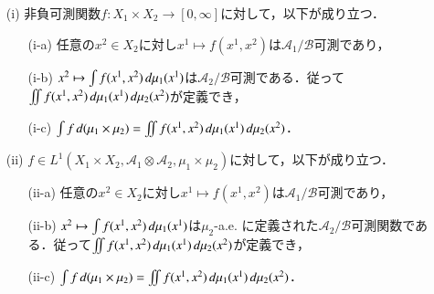 \begin{thm}[Fubini]
\leavevmode
\begin{enumerate}
\item[(i)] 非負可測関数$f \colon X_1 \times X_2 \to [0,\infty]$に対して，以下が成り立つ．
\begin{enumerate}
\item[(i-a)] 任意の$x^2 \in X_2$に対し$x^1 \mapsto f(x^1,x^2)$は$\mathcal{A}_1/\mathcal{B}$可測であり，
\item[(i-b)] $x^2 \mapsto \int f(x^1, x^2) \mathop{}\!d\mu_1(x^1)$は$\mathcal{A}_2/\mathcal{B}$可測である．従って$\iint f(x^1,x^2) \mathop{}\!d\mu_1(x^1) \mathop{}\!d \mu_2(x^2)$が定義でき，
\item[(i-c)] $\int f \mathop{}\!d(\mu_1 \times \mu_2) = \iint f(x^1,x^2) \mathop{}\!d \mu_1(x^1) \mathop{}\!d \mu_2(x^2)$．
\end{enumerate}
\item[(ii)] $f \in L^1(X_1 \times X_2, \mathcal{A}_1 \otimes \mathcal{A}_2, \mu_1 \times \mu_2)$に対して，以下が成り立つ．
\begin{enumerate}
\item[(ii-a)] 任意の$x^2 \in X_2$に対し$x^1 \mapsto f(x^1,x^2)$は$\mathcal{A}_1/\mathcal{B}$可測であり，
\item[(ii-b)] $x^2 \mapsto \int f(x^1, x^2) \mathop{}\!d\mu_1(x^1)$は$\mu_2$-a.e. に定義された$\mathcal{A}_2/\mathcal{B}$可測関数である．従って$\iint f(x^1,x^2) \mathop{}\!d\mu_1(x^1) \mathop{}\!d \mu_2(x^2)$が定義でき，
\item[(ii-c)] $\int f \mathop{}\!d(\mu_1 \times \mu_2) = \iint f(x^1,x^2) \mathop{}\!d \mu_1(x^1) \mathop{}\!d \mu_2(x^2)$．
\end{enumerate}
\end{enumerate}
\end{thm}

